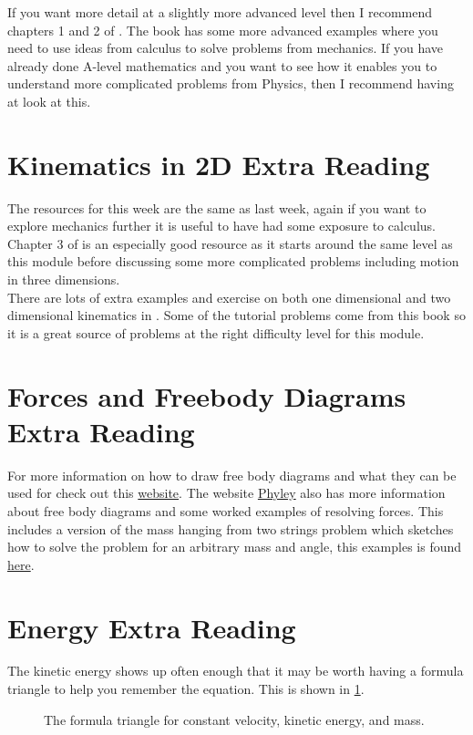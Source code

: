 If you want more detail at a slightly more advanced level then I recommend chapters 1 and 2 of \citep{YandF2019}. The book \citep{mansfield2020understanding} has some more advanced examples where you need to use ideas from calculus to solve problems from mechanics. If you have already done A-level mathematics and you want to see how it enables you to understand more complicated problems from Physics, then I recommend having at look at this.\\


\section{Kinematics in 2D Extra Reading}
The resources for this week are the same as last week, again if you want to explore mechanics further it is useful to have had some exposure to calculus. Chapter 3 of \citep{YandF2019} is an especially good resource as it starts around the same level as this module before discussing some more complicated problems including motion in three dimensions. \\

There are lots of extra examples and exercise on both one dimensional and two dimensional kinematics in \citep{sadler1996understanding}. Some of the tutorial problems come from this book so it is a great source of problems at the right difficulty level for this module. 

\section{Forces and Freebody Diagrams Extra Reading}
For more information on how to draw free body diagrams and what they can be used for check out this \href{https://www.physicsclassroom.com/class/newtlaws/Lesson-2/Drawing-Free-Body-Diagrams}{website}. The website \href{https://www.phyley.com/}{Phyley} also has more information about free  body diagrams and some worked examples of resolving forces. This includes a version of the mass hanging from two strings problem which sketches how to solve the problem for an arbitrary mass and angle, this examples is found \href{https://www.phyley.com/mass-hanging-from-two-ropes}{here}.

\section{Energy Extra Reading}
The kinetic energy shows up often enough that it may be worth having a formula triangle to help you remember the equation. This is shown in \cref{fig: Kmv triangle}.\\
\begin{figure}[ht]
    \centering
    \large {}
    \caption{The formula triangle for constant velocity, kinetic energy, and mass. }
    \label{fig: Kmv triangle}
\end{figure}


